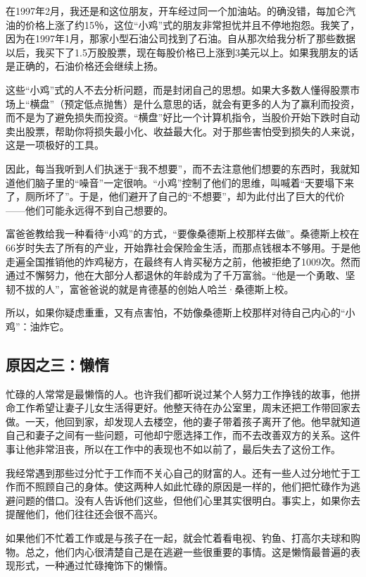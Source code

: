 在1997年2月，我还是和这位朋友，开车经过同一个加油站。的确没错，每加仑汽油的价格上涨了约15％，这位“小鸡”式的朋友非常担忧并且不停地抱怨。我笑了，因为在1997年1月，那家小型石油公司找到了石油。自从那次给我分析了那些数据以后，我买下了1.5万股股票，现在每股价格已上涨到3美元以上。如果我朋友的话是正确的，石油价格还会继续上扬。

这些“小鸡”式的人不去分析问题，而是封闭自己的思想。如果大多数人懂得股票市场上“横盘”（预定低点抛售）是什么意思的话，就会有更多的人为了赢利而投资，而不是为了避免损失而投资。“横盘”好比一个计算机指令，当股价开始下跌时自动卖出股票，帮助你将损失最小化、收益最大化。对于那些害怕受到损失的人来说，这是一项极好的工具。

因此，每当我听到人们执迷于“我不想要”，而不去注意他们想要的东西时，我就知道他们脑子里的“噪音”一定很响。“小鸡”控制了他们的思维，叫喊着“天要塌下来了，厕所坏了”。于是，他们避开了自己的“不想要”，却为此付出了巨大的代价——他们可能永远得不到自己想要的。

富爸爸教给我一种看待“小鸡”的方式，“要像桑德斯上校那样去做”。桑德斯上校在66岁时失去了所有的产业，开始靠社会保险金生活，而那点钱根本不够用。于是他走遍全国推销他的炸鸡秘方，在最终有人肯买秘方之前，他被拒绝了1009次。然而通过不懈努力，他在大部分人都退休的年龄成为了千万富翁。“他是一个勇敢、坚韧不拔的人”，富爸爸说的就是肯德基的创始人哈兰·桑德斯上校。

所以，如果你疑虑重重，又有点害怕，不妨像桑德斯上校那样对待自己内心的“小鸡”：油炸它。

\subsection*{原因之三：懒惰}

忙碌的人常常是最懒惰的人。也许我们都听说过某个人努力工作挣钱的故事，他拼命工作希望让妻子儿女生活得更好。他整天待在办公室里，周末还把工作带回家去做。一天，他回到家，却发现人去楼空，他的妻子带着孩子离开了他。他早就知道自己和妻子之间有一些问题，可他却宁愿选择工作，而不去改善双方的关系。这件事让他非常沮丧，所以在工作中的表现也不如以前了，最后失去了这份工作。

我经常遇到那些过分忙于工作而不关心自己的财富的人。还有一些人过分地忙于工作而不照顾自己的身体。使这两种人如此忙碌的原因是一样的，他们把忙碌作为逃避问题的借口。没有人告诉他们这些，但他们心里其实很明白。事实上，如果你去提醒他们，他们往往还会很不高兴。

如果他们不忙着工作或是与孩子在一起，就会忙着看电视、钓鱼、打高尔夫球和购物。总之，他们内心很清楚自己是在逃避一些很重要的事情。这是懒惰最普遍的表现形式，一种通过忙碌掩饰下的懒惰。


